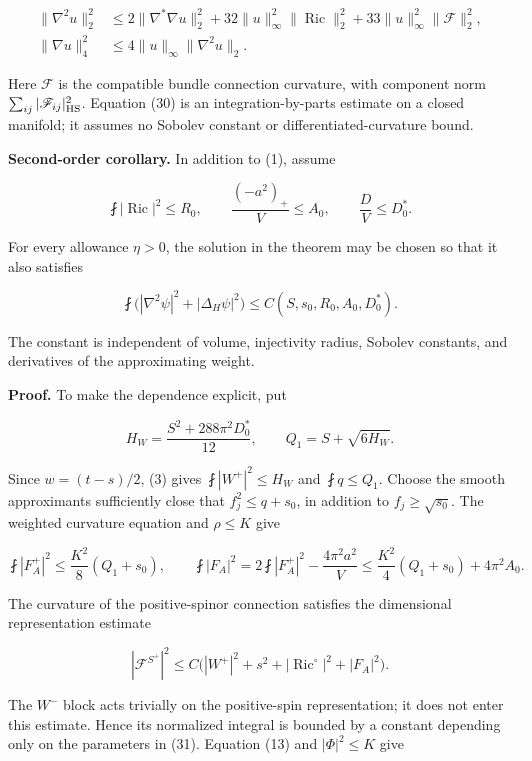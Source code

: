 \documentclass[
  11pt,
]{article}
\begin{document}
\[
\begin{aligned}
 \|\nabla^2u\|_2^2
 &\le2\|\nabla^*\nabla u\|_2^2
       +32\|u\|_\infty^2\|\operatorname{Ric}\|_2^2
       +33\|u\|_\infty^2\|\mathscr F\|_2^2,\\
 \|\nabla u\|_4^2&\le4\|u\|_\infty\|\nabla^2u\|_2.
\end{aligned}
\tag{30}
\]

Here \(\mathscr F\) is the compatible bundle connection curvature, with
component norm \(\sum_{ij}|\mathscr F_{ij}|_{\rm HS}^2\). Equation (30)
is an integration-by-parts estimate on a closed manifold; it assumes no
Sobolev constant or differentiated-curvature bound.

\textbf{Second-order corollary.} In addition to (1), assume

\[
 \fint|\operatorname{Ric}|^2\le R_0,\qquad
 \frac{(-a^2)_+}{V}\le A_0,\qquad
 \frac D V\le D_0^*.
 \tag{31}
\]

For every allowance \(\eta>0\), the solution in the theorem may be
chosen so that it also satisfies

\[
 \boxed{\fint\bigl(|\nabla^2\psi|^2+|\Delta_H\psi|^2\bigr)
       \le C(S,s_0,R_0,A_0,D_0^*).}
 \tag{32}
\]

The constant is independent of volume, injectivity radius, Sobolev
constants, and derivatives of the approximating weight.

\textbf{Proof.} To make the dependence explicit, put

\[
 H_W=\frac{S^2+288\pi^2D_0^*}{12},\qquad
 Q_1=S+\sqrt{6H_W}.
 \tag{33}
\]

Since \(w=(t-s)/2\), (3) gives \(\fint|W^+|^2\le H_W\) and
\(\fint q\le Q_1\). Choose the smooth approximants sufficiently close
that \(f_j^2\le q+s_0\), in addition to \(f_j\ge\sqrt{s_0}\). The
weighted curvature equation and \(\rho\le K\) give

\[
 \fint|F_A^+|^2\le\frac{K^2}{8}(Q_1+s_0),\qquad
 \fint|F_A|^2
 =2\fint|F_A^+|^2-\frac{4\pi^2a^2}{V}
 \le\frac{K^2}{4}(Q_1+s_0)+4\pi^2A_0.
 \tag{34}
\]

The curvature of the positive-spinor connection satisfies the
dimensional representation estimate

\[
 |\mathscr F^{S^+}|^2
 \le C\bigl(|W^+|^2+s^2+|\operatorname{Ric}^{\circ}|^2
                                      +|F_A|^2\bigr).
 \tag{35}
\]

The \(W^-\) block acts trivially on the positive-spin representation; it
does not enter this estimate. Hence its normalized integral is bounded
by a constant depending only on the parameters in (31). Equation (13)
and \(|\Phi|^2\le K\) give
\end{document}
